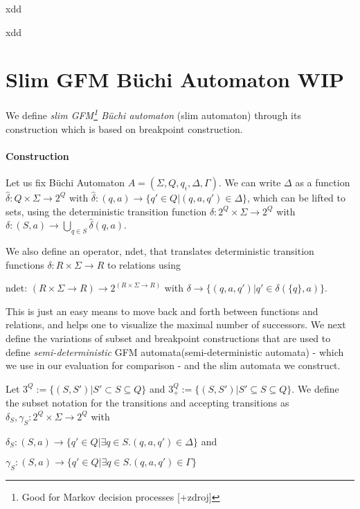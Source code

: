 \documentclass[
	digital
nolof, nolot
]{fithesis3}
\begin{document}
		xdd
		
		xdd
		
		\section{Slim GFM Büchi Automaton WIP}
			We define \emph{slim GFM\footnote{Good for Markov decision processes [+zdroj]} Büchi automaton} (slim automaton) through its construction which is based on breakpoint construction. 
			\paragraph{Construction}
			Let us fix Büchi Automaton $A=(\Sigma, Q, q_i, \Delta, \Gamma)$. We can write $\Delta$ as a function $\hat{\delta}: Q \times \Sigma \rightarrow 2^Q$ with
			$\hat{\delta}: (q, a) \rightarrow \{q' \in Q | (q, a, q') \in \Delta\}$,
			which can be lifted to sets, using the deterministic transition function $\delta: 2^Q \times \Sigma \rightarrow 2^Q$ with
			$\delta: (S, a) \rightarrow
			\bigcup_{q\in S} \hat{\delta}(q,a)$.
			
			We also define an operator, ndet, that translates deterministic transition functions
			$\delta: R \times \Sigma \rightarrow R$ to relations using
			
			ndet: $(R \times \Sigma \rightarrow R) \rightarrow 2^{(R \times \Sigma \rightarrow R)}$
			with
			$\delta \rightarrow \{(q,a,q')|q' \in \delta(\{q\},a)\}$.
			
			This is just an easy means to move back and forth between functions and relations,
			and helps one to visualize the maximal number of successors. We next define the variations of subset and breakpoint constructions that are used to define  \emph{semi-deterministic} GFM automata(semi-deterministic automata) - which we use in our evaluation for comparison - and the slim automata we construct.
			
			Let $3^Q :=\{(S,S')|S'\subset S \subseteq Q\}$ and
			$3^Q_+:=\{(S,S')|S'\subseteq S \subseteq Q\}$.
			We define the subset notation for the transitions and accepting transitions as $\delta_S,\gamma_S:2^Q \times \Sigma \rightarrow 2^Q$ with
			
			$\delta_S: (S,a)\rightarrow\{q'\in Q | \exists q \in S.(q,a,q') \in \Delta\}$ and
			
			$\gamma_S: (S,a)\rightarrow\{q'\in Q | \exists q \in S.(q,a,q') \in \Gamma\}$
			
			
		
\end{document}
